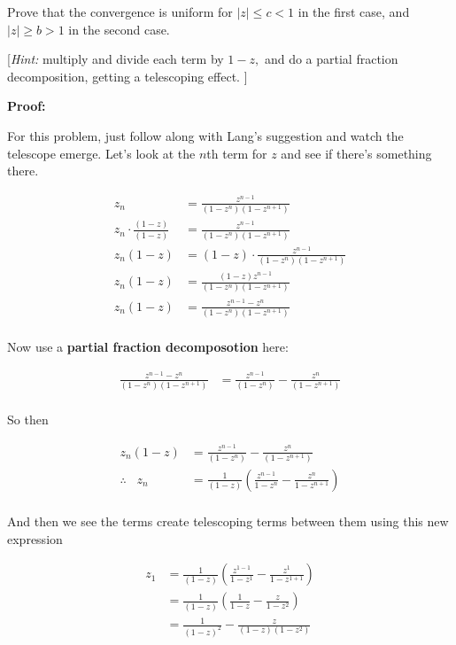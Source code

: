 \begin{enumerate}
	Prove that the convergence is uniform for $|z| \leq c < 1$ in the first case, and $|z| \geq b > 1$ in the second case. 

	[\textit{Hint:} multiply and divide each term by $1 - z,$ and do a partial fraction decomposition, getting a telescoping effect. ]

	\textbf{Proof:}
	
	For this problem, just follow along with Lang's suggestion and watch the telescope emerge. Let's look at the $n$th term for $z$ and see 
	if there's something there.

	\begin{align*}
		z_n &= \frac{z^{n - 1}}{(1 - z^{n})(1 - z^{n + 1})} \\
		z_n \cdot \frac{(1 - z)}{(1 - z)} &= \frac{z^{n - 1}}{(1 - z^{n})(1 - z^{n + 1})} \\
		z_n (1 - z) &= (1 - z) \cdot \frac{z^{n - 1}}{(1 - z^{n})(1 - z^{n + 1})} \\
		z_n (1 - z) &=  \frac{(1 - z)z^{n - 1}}{(1 - z^{n})(1 - z^{n + 1})} \\
		z_n (1 - z) &=  \frac{z^{n - 1} - z^n}{(1 - z^{n})(1 - z^{n + 1})} \\
	\end{align*}

	Now use a \textbf{partial fraction decomposotion} here:

	\begin{align*}
		\frac{z^{n - 1} - z^n}{(1 - z^{n})(1 - z^{n + 1})} &=  \frac{z^{n - 1}}{(1 - z^{n})} - \frac{z^n}{(1 - z^{n + 1})} \\
	\end{align*}

	So then

	\begin{align*}
		z_n (1 - z) &=  \frac{z^{n - 1}}{(1 - z^{n})} - \frac{z^n}{(1 - z^{n + 1})} \\
		\therefore \;\;\; z_n &=  \frac{1}{(1 - z)} \left( \frac{z^{n - 1}}{1 - z^{n}} - \frac{z^n}{1 - z^{n + 1}} \right) \\
	\end{align*}

	And then we see the terms create telescoping terms between them using this new expression

	\begin{align*}
		z_1 &= \frac{1}{(1 - z)} \left( \frac{z^{1 - 1}}{1 - z^{1}} - \frac{z^1}{1 - z^{1 + 1}} \right) \\
		&= \frac{1}{(1 - z)} \left( \frac{1}{1 - z} - \frac{z}{1 - z^{2}} \right) \\
		&= \frac{1}{(1 - z)^2} - \frac{z}{(1 - z)(1 - z^{2})} \\
	\end{align*}


\end{enumerate}
